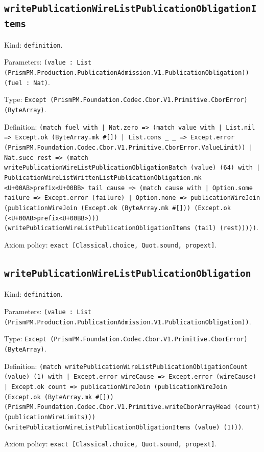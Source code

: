 \documentclass[11pt]{article}
\begin{document}
\subsection*{\texttt{writePublicationWireListPublicationObligationItems}}
\noindent Kind: \texttt{definition}.\par
\noindent Parameters: \texttt{(value : List (PrismPM.Production.PublicationAdmission.V1.PublicationObligation)) (fuel : Nat)}.\par
\noindent Type: \texttt{Except (PrismPM.Foundation.Codec.Cbor.V1.Primitive.CborError) (ByteArray)}.\par
\noindent Definition: \texttt{(match fuel with | Nat.zero => (match value with | List.nil => Except.ok (ByteArray.mk \#[]) | List.cons \_ \_ => Except.error (PrismPM.Foundation.Codec.Cbor.V1.Primitive.CborError.ValueLimit)) | Nat.succ rest => (match writePublicationWireListPublicationObligationBatch (value) (64) with | PublicationWireListWrittenListPublicationObligation.mk <U+00AB>prefix<U+00BB> tail cause => (match cause with | Option.some failure => Except.error (failure) | Option.none => publicationWireJoin (publicationWireJoin (Except.ok (ByteArray.mk \#[])) (Except.ok (<U+00AB>prefix<U+00BB>))) (writePublicationWireListPublicationObligationItems (tail) (rest)))))}.\par
\noindent Axiom policy: \texttt{exact [Classical.choice, Quot.sound, propext]}.\par
\subsection*{\texttt{writePublicationWireListPublicationObligation}}
\noindent Kind: \texttt{definition}.\par
\noindent Parameters: \texttt{(value : List (PrismPM.Production.PublicationAdmission.V1.PublicationObligation))}.\par
\noindent Type: \texttt{Except (PrismPM.Foundation.Codec.Cbor.V1.Primitive.CborError) (ByteArray)}.\par
\noindent Definition: \texttt{(match writePublicationWireListPublicationObligationCount (value) (1) with | Except.error wireCause => Except.error (wireCause) | Except.ok count => publicationWireJoin (publicationWireJoin (Except.ok (ByteArray.mk \#[])) (PrismPM.Foundation.Codec.Cbor.V1.Primitive.writeCborArrayHead (count) (publicationWireLimits))) (writePublicationWireListPublicationObligationItems (value) (1)))}.\par
\noindent Axiom policy: \texttt{exact [Classical.choice, Quot.sound, propext]}.\par
\end{document}
